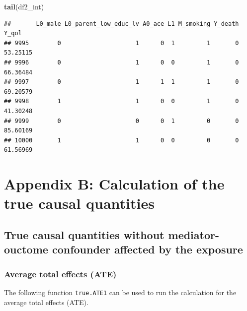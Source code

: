 \documentclass[
]{book}
\newenvironment{Shaded}{\begin{snugshade}}{\end{snugshade}}
\newcommand{\FunctionTok}[1]{\textcolor[rgb]{0.13,0.29,0.53}{\textbf{#1}}}
\newcommand{\NormalTok}[1]{#1}
\begin{document}
\begin{Shaded}
\begin{Highlighting}[]
\FunctionTok{tail}\NormalTok{(df2\_int)}
\end{Highlighting}
\end{Shaded}

\begin{verbatim}
##       L0_male L0_parent_low_educ_lv A0_ace L1 M_smoking Y_death    Y_qol
## 9995        0                     1      0  1         1       0 53.25115
## 9996        0                     1      0  0         1       0 66.36484
## 9997        0                     1      1  1         1       0 69.20579
## 9998        1                     1      0  0         1       0 41.30248
## 9999        0                     0      0  1         0       0 85.60169
## 10000       1                     1      0  0         0       0 61.56969
\end{verbatim}

\hypertarget{appendix_b}{%
\chapter{Appendix B: Calculation of the true causal quantities}\label{appendix_b}}

\hypertarget{true-causal-quantities-without-mediator-ouctome-confounder-affected-by-the-exposure}{%
\section{True causal quantities without mediator-ouctome confounder affected by the exposure}\label{true-causal-quantities-without-mediator-ouctome-confounder-affected-by-the-exposure}}

\hypertarget{average-total-effects-ate}{%
\subsection{Average total effects (ATE)}\label{average-total-effects-ate}}

The following function \texttt{true.ATE1} can be used to run the calculation for the average total effects (ATE).
\end{document}
